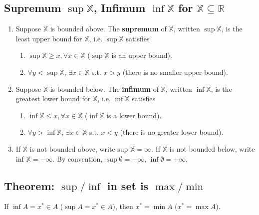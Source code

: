 \documentclass[11pt]{elegantbook}
\begin{document}
\subsection{Supremum $\sup\mathbb{X}$, Infimum $\inf\mathbb{X}$ for $\mathbb{X}\subseteq \mathbb{R}$}
\begin{definition}
    \normalfont
    \begin{enumerate}[(1).]
        \item Suppose $\mathbb{X}$ is bounded above. The \textbf{supremum} of $\mathbb{X}$, written $\sup\mathbb{X}$, is the least upper bound for $\mathbb{X}$, i.e. $\sup\mathbb{X}$ satisfies
        \begin{enumerate}
            \item $\sup\mathbb{X} \geq x,\forall x\in \mathbb{X}$ ($\sup\mathbb{X}$ is an upper bound).
            \item $\forall y<\sup\mathbb{X}$, $\exists x\in\mathbb{X}$ s.t. $x>y$ (there is no smaller upper bound).
        \end{enumerate}
        \item Suppose $\mathbb{X}$ is bounded below. The \textbf{infimum} of $\mathbb{X}$, written $\inf\mathbb{X}$, is the greatest lower bound for $\mathbb{X}$, i.e. $\inf\mathbb{X}$ satisfies
        \begin{enumerate}
            \item $\inf\mathbb{X} \leq x,\forall x\in \mathbb{X}$ ($\inf\mathbb{X}$ is a lower bound).
            \item $\forall y>\inf\mathbb{X}$, $\exists x\in\mathbb{X}$ s.t. $x<y$ (there is no greater lower bound).
        \end{enumerate}
        \item If $\mathbb{X}$ is not bounded above, write sup $\mathbb{X} = \infty$. If $\mathbb{X}$ is not bounded below, write inf $\mathbb{X} = -\infty$. By convention, $\sup \emptyset = -\infty$, $\inf \emptyset = +\infty$.
    \end{enumerate}
\end{definition}

\subsection{Theorem: $\sup/\inf$ in set is $\max/\min$}
\begin{proposition}
    If $\inf A=x^*\in A$ ($\sup A=x^*\in A$), then $x^*=\min A$ ($x^*=\max A$).
\end{proposition}
\end{document}
